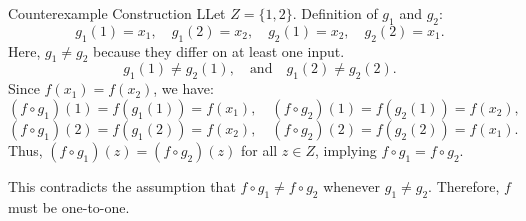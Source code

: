 \documentclass{report}
\begin{document}
\begin{RemarkWithLily}{Counterexample Construction}
    LLet $Z = \{1, 2\}$. Definition of $g_1$ and $g_2$:
    \[
    g_1(1) = x_1, \quad g_1(2) = x_2, \quad g_2(1) = x_2, \quad g_2(2) = x_1.
    \]
    Here, $g_1 \neq g_2$ because they differ on at least one input.
    \[
    g_1(1) \neq g_2(1), \quad \text{and} \quad g_1(2) \neq g_2(2).
    \]
    Since $f(x_1) = f(x_2)$, we have:
    \[
    (f \circ g_1)(1) = f(g_1(1)) = f(x_1), \quad (f \circ g_2)(1) = f(g_2(1)) = f(x_2),
    \]
    \[
    (f \circ g_1)(2) = f(g_1(2)) = f(x_2), \quad (f \circ g_2)(2) = f(g_2(2)) = f(x_1).
    \]
    Thus, $(f \circ g_1)(z) = (f \circ g_2)(z)$ for all $z \in Z$, implying $f \circ g_1 = f \circ g_2$.

    This contradicts the assumption that $f \circ g_1 \neq f \circ g_2$ whenever $g_1 \neq g_2$. Therefore, $f$ must be one-to-one.
\end{RemarkWithLily}
\end{document}
